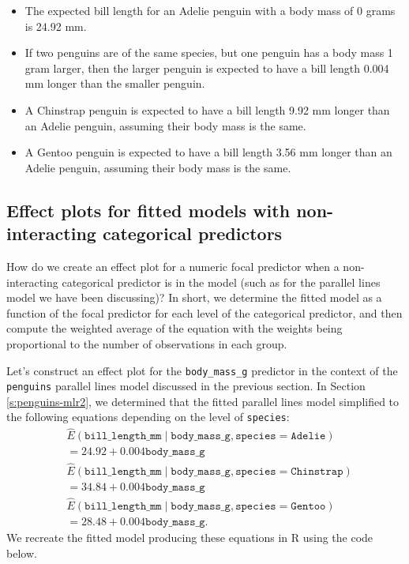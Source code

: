 \documentclass[
]{book}
\providecommand{\tightlist}{%
  \setlength{\itemsep}{0pt}\setlength{\parskip}{0pt}}
\theoremstyle{definition}
\theoremstyle{definition}
\theoremstyle{definition}
\theoremstyle{definition}
\theoremstyle{remark}
\begin{document}
\begin{itemize}
\tightlist
\item
  The expected bill length for an Adelie penguin with a body mass of 0
  grams is 24.92 mm.
\item
  If two penguins are of the same species, but one penguin has a body
  mass 1 gram larger, then the larger penguin is expected to have a
  bill length 0.004 mm longer than the smaller penguin.
\item
  A Chinstrap penguin is expected to have a bill length 9.92 mm longer
  than an Adelie penguin, assuming their body mass is the same.
\item
  A Gentoo penguin is expected to have a bill length 3.56 mm longer
  than an Adelie penguin, assuming their body mass is the same.
\end{itemize}

\hypertarget{effect-plots-for-fitted-models-with-non-interacting-categorical-predictors}{%
\subsection{Effect plots for fitted models with non-interacting categorical predictors}\label{effect-plots-for-fitted-models-with-non-interacting-categorical-predictors}}

How do we create an effect plot for a numeric focal predictor when a
non-interacting categorical predictor is in the model (such as for the
parallel lines model we have been discussing)? In short, we determine
the fitted model as a function of the focal predictor for each level of
the categorical predictor, and then compute the weighted average of the
equation with the weights being proportional to the number of
observations in each group.

Let's construct an effect plot for the \texttt{body\_mass\_g} predictor in the
context of the \texttt{penguins} parallel lines model discussed in the previous
section. In Section \ref{s:penguins-mlr2}, we determined that the
fitted parallel lines model simplified to the following equations
depending on the level of \texttt{species}: \[
\begin{aligned}
&\hat{E}(\mathtt{bill\_length\_mm} \mid \mathtt{body\_mass\_g}, \mathtt{species}=\mathtt{Adelie}) \\
&= 24.92 + 0.004 \mathtt{body\_mass\_g} \\
&\hat{E}(\mathtt{bill\_length\_mm} \mid \mathtt{body\_mass\_g}, \mathtt{species}=\mathtt{Chinstrap}) \\
&= 34.84 + 0.004 \mathtt{body\_mass\_g} \\
&\hat{E}(\mathtt{bill\_length\_mm} \mid \mathtt{body\_mass\_g}, \mathtt{species}=\mathtt{Gentoo}) \\
&= 28.48 + 0.004 \mathtt{body\_mass\_g}.
\end{aligned}
\label{eq:pl-equations}
\] We recreate the fitted model producing these equations in R using the
code below.
\end{document}
